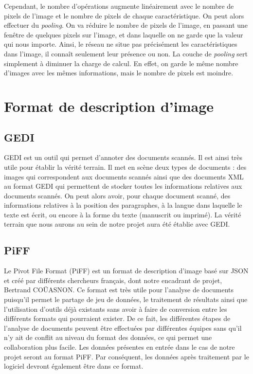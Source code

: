 Cependant, le nombre d'opérations augmente linéairement avec le nombre de pixels de l'image et le
nombre de pixels de chaque caractéristique. On peut alors effectuer du \textit{pooling}. On va
réduire le nombre de pixels de l'image, en passant une fenêtre de quelques pixels sur l'image,
et dans laquelle on ne garde que la valeur qui nous importe. Ainsi, le réseau ne situe pas précisément
les caractéristiques dans l'image, il connaît seulement leur présence ou non. La couche de
\textit{pooling} sert simplement à diminuer la charge de calcul. En effet, on garde le même nombre
d'images avec les mêmes informations, mais le nombre de pixels est moindre.

\section{Format de description d'image}

\subsection{GEDI}

GEDI est un outil qui permet d'annoter des documents scannés. Il est ainsi très utile pour établir
la vérité terrain. Il met en scène deux types de documents : des images qui correspondent aux documents
scannés ainsi que des documents XML au format GEDI qui permettent de stocker toutes les informations
relatives aux documents scannés. On peut alors avoir, pour chaque document scanné, des informations
relatives à la position des paragraphes, à la langue dans laquelle le texte est écrit, ou encore à
la forme du texte (manuscrit ou imprimé). La vérité terrain que nous aurons au sein de notre projet
aura été établie avec GEDI.

\subsection{PiFF}

Le Pivot File Format (PiFF) est un format de description d'image basé sur JSON et créé par différents
chercheurs français, dont notre encadrant de projet, Bertrand COÜASNON. Ce format est très utile pour l'analyse
de documents puisqu'il permet le partage de jeu de données, le traitement de résultats ainsi que
l'utilisation d'outils déjà existants sans avoir à faire de conversion entre les différents formats
qui pourraient exister. De ce fait, les différentes étapes de l'analyse de documents peuvent être effectuées
par différentes équipes sans qu'il n'y ait de conflit au niveau du format des données, ce qui permet une
collaboration plus facile. Les données présentes en entrée dans le cas de notre projet seront au format PiFF.
Par conséquent, les données après traitement par le logiciel devront également être dans ce format.